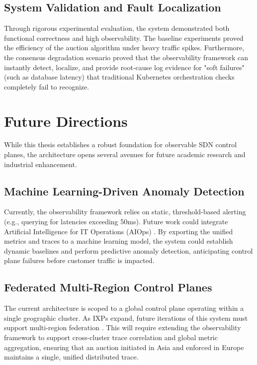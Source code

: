 \begin{conclusion}
\subsection{System Validation and Fault Localization}
Through rigorous experimental evaluation, the system demonstrated both functional correctness and high observability. The baseline experiments proved the efficiency of the auction algorithm under heavy traffic spikes. Furthermore, the consensus degradation scenario proved that the observability framework can instantly detect, localize, and provide root-cause log evidence for "soft failures" (such as database latency) that traditional Kubernetes orchestration checks completely fail to recognize.

\section{Future Directions}

While this thesis establishes a robust foundation for observable SDN control planes, the architecture opens several avenues for future academic research and industrial enhancement.

\subsection{Machine Learning-Driven Anomaly Detection}
Currently, the observability framework relies on static, threshold-based alerting (e.g., querying for latencies exceeding 50ms). Future work could integrate Artificial Intelligence for IT Operations (AIOps) \cite{gomesImpactOpenTelemetryConfiguration2024}. By exporting the unified metrics and traces to a machine learning model, the system could establish dynamic baselines and perform predictive anomaly detection, anticipating control plane failures before customer traffic is impacted.

\subsection{Federated Multi-Region Control Planes}
The current architecture is scoped to a global control plane operating within a single geographic cluster. As IXPs expand, future iterations of this system must support multi-region federation \cite{chanGoogleCloudLoadBalancing2019}. This will require extending the observability framework to support cross-cluster trace correlation and global metric aggregation, ensuring that an auction initiated in Asia and enforced in Europe maintains a single, unified distributed trace.


\end{conclusion}
